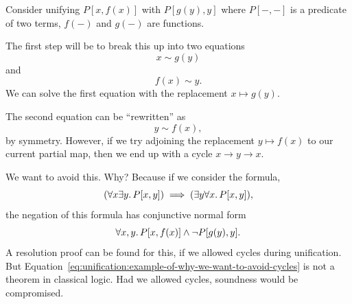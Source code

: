 \begin{example}
Consider unifying $P[x,f(x)]$ with $P[g(y),y]$ where $P[-,-]$ is a
predicate of two terms, $f(-)$ and $g(-)$ are functions.

The first step will be to break this up into two equations
\begin{equation}
x\sim g(y)
\end{equation}
and
\begin{equation}
f(x)\sim y.
\end{equation}
We can solve the first equation with the replacement $x\mapsto g(y)$.

The second equation can be ``rewritten'' as
\begin{equation}
y\sim f(x),
\end{equation}
by symmetry. However, if we try adjoining the replacement $y\mapsto f(x)$
to our current partial map, then we end up with a cycle $x\to y\to x$.

We want to avoid this. Why? Because if we consider the formula,
\begin{equation}\label{eq:unification:example-of-why-we-want-to-avoid-cycles}
(\forall x\exists y\ldotp P[x,y])\implies(\exists y\forall x\ldotp P[x,y]),
\end{equation}
the negation of this formula has conjunctive normal form
\begin{equation}
\forall x,y\ldotp P[x,f(x)]\land\neg P[g(y),y].
\end{equation}
A resolution proof can be found for this, if we allowed cycles during
unification. But Equation~\eqref{eq:unification:example-of-why-we-want-to-avoid-cycles}
is not a theorem in classical logic. Had we allowed cycles, soundness
would be compromised. 
\end{example}

